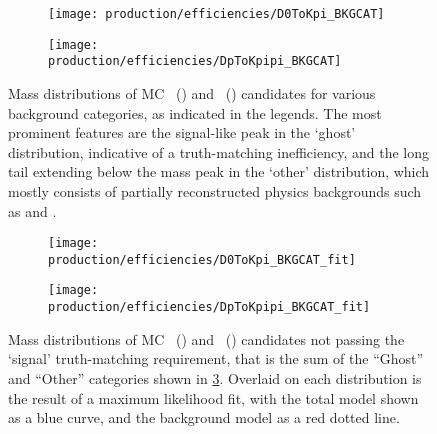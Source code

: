\begin{figure}
  \begin{subfigure}[b]{0.5\textwidth}
    \centering
    \texttt{[image: production/efficiencies/D0ToKpi\_BKGCAT]}
    \caption{\PDzero}
    \label{fig:prod:effs:truth:categories:D0ToKpi}
  \end{subfigure}
  \begin{subfigure}[b]{0.5\textwidth}
    \centering
    \texttt{[image: production/efficiencies/DpToKpipi\_BKGCAT]}
    \caption{\PDplus}
    \label{fig:prod:effs:truth:categories:DpToKpipi}
  \end{subfigure}
  \caption{%
    Mass distributions of \ac{MC} 
    \PDzero~() and 
    \PDplus~() candidates for 
    various background categories, as indicated in the legends.
    The most prominent features are the signal-like peak in the `ghost' 
    distribution, indicative of a truth-matching inefficiency, and the long 
    tail extending below the mass peak in the `other' distribution, which 
    mostly consists of partially reconstructed physics backgrounds such as 
    \decay{\PDzero}{\PKminus\Ppiplus\Ppizero} and 
    \decay{\PDplus}{\PKminus\Ppiplus\Ppiplus\Ppizero}.
  }
  \label{fig:prod:effs:truth:categories}
\end{figure}

\begin{figure}
  \begin{subfigure}[b]{0.5\textwidth}
    \centering
    \texttt{[image: production/efficiencies/D0ToKpi\_BKGCAT\_fit]}
    \caption{\DzToKpi}
    \label{fig:prod:effs:truth:fit:D0ToKpi}
  \end{subfigure}
  \begin{subfigure}[b]{0.5\textwidth}
    \centering
    \texttt{[image: production/efficiencies/DpToKpipi\_BKGCAT\_fit]}
    \caption{\DpToKpipi}
    \label{fig:prod:effs:truth:fit:DpToKpipi}
  \end{subfigure}
  \caption{%
    Mass distributions of \ac{MC} 
    \PDzero~() and 
    \PDplus~() candidates not 
    passing the `signal' truth-matching requirement, that is the sum of the 
    ``Ghost'' and ``Other'' categories shown in 
    \cref{fig:prod:effs:truth:categories}.
    Overlaid on each distribution is the result of a maximum likelihood fit, 
    with the total model shown as a blue curve, and the background model as a 
    red dotted line.
  }
  \label{fig:prod:effs:truth:fit}
\end{figure}

